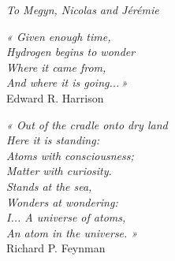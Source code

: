 

\emptypage

\thispagestyle{empty}

\vspace*{-1.5cm}

\hspace*{0.34\textwidth} {\LARGE \emph{To Megyn, Nicolas and Jérémie}}\\

\vspace*{6.5cm}
\hspace*{0.55\textwidth}
\begin{minipage}{0.40\textwidth}
\emph{« Given enough time,\\
\hspace*{0.3cm}Hydrogen begins to wonder\\
\hspace*{0.3cm}Where it came from,\\
\hspace*{0.3cm}And where it is going...\,»}\\
\vspace*{0.4cm}
\hspace*{1cm}Edward R. Harrison\\
\end{minipage}

\vspace*{2.0cm}

\hspace*{0.55\textwidth}
\begin{minipage}{0.40\textwidth}
\emph{« Out of the cradle onto dry land\\
\hspace*{0.3cm}Here it is standing:\\
\hspace*{0.3cm}Atoms with consciousness;\\
\hspace*{0.3cm}Matter with curiosity.\\
\newline
\hspace*{0.3cm}Stands at the sea,\\
\hspace*{0.3cm}Wonders at wondering:\\
\hspace*{0.3cm}I... A universe of atoms,\\
\hspace*{0.3cm}An atom in the universe. »}\\
\vspace*{0.4cm}
\hspace*{1cm}Richard P. Feynman
\end{minipage}

